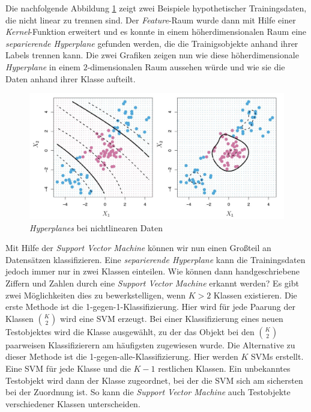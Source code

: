 Die nachfolgende Abbildung \ref{fig:non_linear_data} zeigt zwei Beispiele hypothetischer Trainingsdaten, die nicht linear zu trennen sind.
Der \textit{Feature}-Raum wurde dann mit Hilfe einer \textit{Kernel}-Funktion erweitert und es konnte in einem höherdimensionalen Raum eine
\textit{separierende Hyperplane} gefunden werden, die die Trainigsobjekte anhand ihrer Labels trennen kann. 
Die zwei Grafiken zeigen nun wie diese höherdimensionale \textit{Hyperplane} in einem $2$-dimensionalen Raum aussehen würde 
und wie sie die Daten anhand ihrer Klasse aufteilt.
\begin{figure}[H]
	\centering
	\includegraphics[width=\imgMed]{images/theory/non_linear_data.jpg}
	\caption{\textit{Hyperplanes} bei nichtlinearen Daten \cite[S. 353]{james_2013}} 
	\label{fig:non_linear_data}
\end{figure}
Mit Hilfe der \textit{Support Vector Machine} können wir nun einen Großteil an Datensätzen klassifizieren. 
Eine \textit{separierende Hyperplane} kann die Trainingsdaten jedoch immer nur in zwei Klassen einteilen. 
Wie können dann handgeschriebene Ziffern und Zahlen durch eine \textit{Support Vector Machine} erkannt werden?
Es gibt zwei Möglichkeiten dies zu bewerkstelligen, wenn $K > 2$ Klassen existieren.
Die erste Methode ist die 1-gegen-1-Klassifizierung. Hier wird für jede Paarung der Klassen $K \choose 2$
wird eine SVM erzeugt. Bei einer Klassifizierung eines neuen Testobjektes wird die Klasse ausgewählt, zu der das Objekt bei den
$K \choose 2$ paarweisen Klassifizierern am häufigsten zugewiesen wurde.
Die Alternative zu dieser Methode ist die 1-gegen-alle-Klassifizierung. Hier werden $K$ SVMs erstellt.
Eine SVM für jede Klasse und die $K-1$ restlichen Klassen. Ein unbekanntes Testobjekt wird dann der Klasse zugeordnet,
bei der die SVM sich am sichersten bei der Zuordnung ist. 
So kann die \textit{Support Vector Machine} auch Testobjekte verschiedener Klassen unterscheiden.\cite[S. 355f.]{james_2013}\cite[S.1567]{noble_2006}


